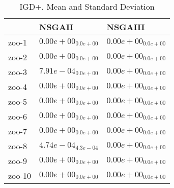 \documentclass{article}
\begin{document}
\begin{table}
\caption{IGD+. Mean and Standard Deviation}
\label{table: IGD+}
\centering
\begin{scriptsize}
\begin{tabular}{lll}
\hline & NSGAII &  NSGAIII\\
\hline 
zoo-1 & \cellcolor{gray95}$  0.00e+00_{ 0.0e+00}$ & \cellcolor{gray25}$  0.00e+00_{ 0.0e+00}$ \\
zoo-2 & \cellcolor{gray95}$  0.00e+00_{ 0.0e+00}$ & \cellcolor{gray25}$  0.00e+00_{ 0.0e+00}$ \\
zoo-3 & \cellcolor{gray25}$  7.91e-04_{ 0.0e+00}$ & \cellcolor{gray95}$  0.00e+00_{ 0.0e+00}$ \\
zoo-4 & \cellcolor{gray95}$  0.00e+00_{ 0.0e+00}$ & \cellcolor{gray25}$  0.00e+00_{ 0.0e+00}$ \\
zoo-5 & \cellcolor{gray95}$  0.00e+00_{ 0.0e+00}$ & \cellcolor{gray25}$  0.00e+00_{ 0.0e+00}$ \\
zoo-6 & \cellcolor{gray95}$  0.00e+00_{ 0.0e+00}$ & \cellcolor{gray25}$  0.00e+00_{ 0.0e+00}$ \\
zoo-7 & \cellcolor{gray95}$  0.00e+00_{ 0.0e+00}$ & \cellcolor{gray25}$  0.00e+00_{ 0.0e+00}$ \\
zoo-8 & \cellcolor{gray25}$  4.74e-04_{ 4.3e-04}$ & \cellcolor{gray95}$  0.00e+00_{ 0.0e+00}$ \\
zoo-9 & \cellcolor{gray95}$  0.00e+00_{ 0.0e+00}$ & \cellcolor{gray25}$  0.00e+00_{ 0.0e+00}$ \\
zoo-10 & \cellcolor{gray95}$  0.00e+00_{ 0.0e+00}$ & \cellcolor{gray25}$  0.00e+00_{ 0.0e+00}$ \\
\hline
\end{tabular}
\end{scriptsize}
\end{table}
\end{document}
